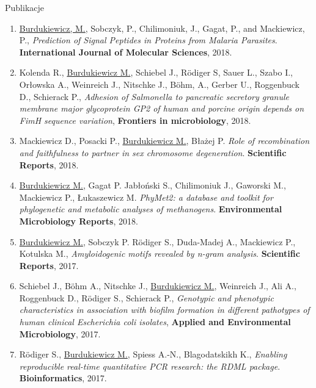 \documentclass{beamer}\usepackage[]{graphicx}\usepackage[]{color}
\begin{document}
\begin{frame}[allowframebreaks]{Publikacje}

\small
\begin{enumerate}  

\item \underline{Burdukiewicz, M.}, Sobczyk, P., Chilimoniuk, J., Gagat, P., and Mackiewicz, P., \textit{Prediction of Signal Peptides in Proteins from Malaria Parasites}. \textbf{International Journal of Molecular Sciences}, 2018.

\item Kolenda R., \underline{Burdukiewicz M.}, Schiebel J., Rödiger S, Sauer L., Szabo I., Orłowska A., Weinreich J., Nitschke J., Böhm, A., Gerber U., Roggenbuck D., Schierack P., \textit{Adhesion of Salmonella to pancreatic secretory granule membrane major glycoprotein GP2 of human and porcine origin depends on FimH sequence variation}, \textbf{Frontiers in microbiology}, 2018.

\item Mackiewicz D., Posacki P., \underline{Burdukiewicz M.}, Błażej P. \textit{Role of recombination and faithfulness to partner in sex chromosome degeneration}. \textbf{Scientific Reports}, 2018.

\item \underline{Burdukiewicz M.}, Gagat P. Jab\l{}o\'nski S., Chilimoniuk J., 
Gaworski M., Mackiewicz P., \L{}ukaszewicz M. \textit{PhyMet2: a database and toolkit for phylogenetic and metabolic analyses of methanogens}.
\textbf{Environmental Microbiology Reports}, 2018.

\item \underline{Burdukiewicz M.}, Sobczyk P. R\"{o}diger S., Duda-Madej A., 
Mackiewicz P., Kotulska M., \textit{Amyloidogenic motifs revealed by n-gram 
analysis}. 
\textbf{Scientific Reports}, 2017. 

\item Schiebel J., B\"{o}hm A., Nitschke J., \underline{Burdukiewicz M.}, 
Weinreich J., Ali A., Roggenbuck
D., R\"{o}diger S., Schierack P., \textit{Genotypic and phenotypic 
characteristics in association
with biofilm formation in different pathotypes of human clinical Escherichia 
coli isolates},
\textbf{Applied and Environmental Microbiology}, 2017.

\item R\"{o}diger S., \underline{Burdukiewicz M.}, Spiess A.-N., Blagodatskikh 
K., \textit{Enabling reproducible real-time quantitative PCR research: the RDML 
package}. 
\textbf{Bioinformatics}, 2017.


\end{enumerate}
\end{frame}
\end{document}

